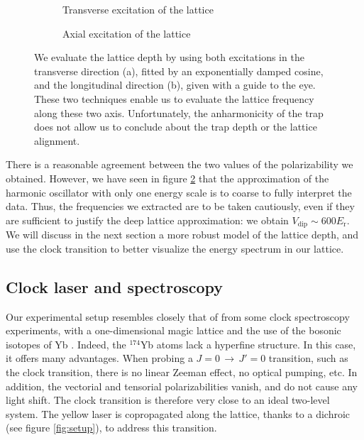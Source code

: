 \documentclass[11pt]{article}
\numberwithin{equation}{section}
\numberwithin{figure}{section}
\begin{document}
%
\begin{figure}[htbp]
	\centering
	\begin{subfigure}[b]{0.48\textwidth}
		\centering
		\small
   		
		\caption{\small Transverse excitation of the lattice}
		\label{fig:lattice_sloshing}
	\end{subfigure}
	\begin{subfigure}[b]{0.48\textwidth}
    	\centering
    	\small
    			
		\caption{\small Axial excitation of the lattice}
		\label{fig:lattice_para}
	\end{subfigure}	
	\caption{\small We evaluate the lattice depth by using both excitations in the transverse direction (a), fitted by an exponentially damped cosine, and the longitudinal direction (b), given with a guide to the eye. These two techniques enable us to evaluate the lattice frequency along these two axis. Unfortunately, the anharmonicity of the trap does not allow us to conclude about the trap depth or the lattice alignment.}
    \label{fig:lattice_cara}
\end{figure}
%

There is a reasonable agreement between the two values of the polarizability we obtained. However, we have seen in figure \ref{fig:lattice_para} that the approximation of the harmonic oscillator with only one energy scale is to coarse to fully interpret the data. Thus, the frequencies we extracted are to be taken cautiously, even if they are sufficient to justify the deep lattice approximation: we obtain $V_\text{dip} \sim 600 E_\text{r}$. We will discuss in the next section a more robust model of the lattice depth, and use the clock transition to better visualize the energy spectrum in our lattice.


\subsection{Clock laser and spectroscopy}
\label{sec:clock}

Our experimental setup resembles closely that of from some clock spectroscopy experiments, with a one-dimensional magic lattice and the use of the bosonic isotopes of Yb \citep{2008_poli}. Indeed, the $^{174}$Yb atoms lack a hyperfine structure. In this case, it offers many advantages. When probing a $J=0 \, \rightarrow \, J'=0$ transition, such as the clock transition, there is no linear Zeeman effect, no optical pumping, etc. In addition, the vectorial and tensorial polarizabilities vanish, and do not cause any light shift. The clock transition is therefore very close to an ideal two-level system. The yellow laser is copropagated along the lattice, thanks to a dichroic (see figure \ref{fig:setup}), to address this transition.
\end{document}

